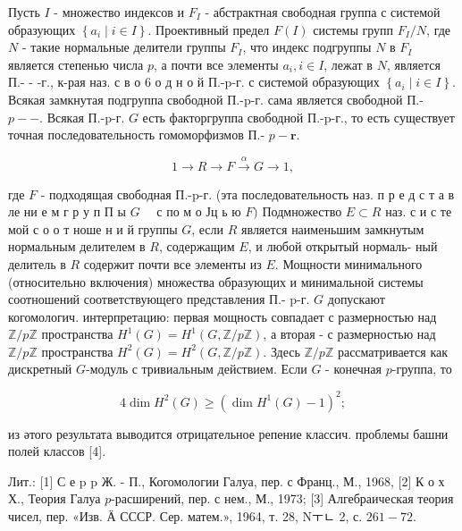 \documentclass[10pt]{article}
\begin{document}
Пусть $I$ - множество индексов и $F_{I}$ - абстрактная свободная группа с системой образующих $\left\{a_{i} \mid i \in I\right\}$. Проективный предел $F(I)$ системы групп $F_{I} / N$, где $N$ - такие нормальные делители группы $F_{I}$, что индекс подгруппы $N$ в $F_{I}$ является степенью числа $p$, а почти все элементы $a_{i}, i \in I$, лежат в $N$, является П.- - -г., к-рая наз. с в о 6 о д н о й П.-p-г. с системой образующих $\left\{a_{i} \mid i \in I\right\}$. Всякая замкнутая подгруппа свободной П.-p-г. сама является свободной П.- $p-\mathbf{-}$. Всякая П.-p-г. $G$ есть факторгруппа свободной П.-p-г., то есть существует точная последовательность гомоморфизмов П.- $p-\mathbf{r}$.



\[

1 \rightarrow R \longrightarrow F \stackrel{\alpha}{\rightarrow} G \longrightarrow 1,

\]



где $F$ - подходящая свободная П.-p-г. (эта последовательность наз. п р е д с т а в ле ни е м г р у п П ы $G \quad$ с по м о Јц ь ю $F)$ Подмножество $E \subset R$ наз. с и с те мой с о о т ноше н и й группы $G$, если $R$ является наименьшим замкнутым нормальным делителем в $R$, содержащим $E$, и любой открытый нормаль- ный делитель в $R$ содержит почти все элементы из $E$. Мощности минимального (относительно включения) множества образующих и минимальной системы соотношений соответствующего представления П.- p-г. $G$ допускают когомологич. интерпретацию: первая мощность совпадает с размерностью над $\mathbb{Z} / p \mathbb{Z}$ пространства $H^{1}(G)=H^{1}(G, \mathbb{Z} / p \mathbb{Z})$, а вторая - с размерностью над $\mathbb{Z} / p \mathbb{Z}$ пространства $H^{2}(G)=H^{2}(G, \mathbb{Z} / p \mathbb{Z})$. Здесь $\mathbb{Z} / p \mathbb{Z}$ рассматривается как дискретный $G$-модуль с тривиальным действием. Если $G$ - конечная $p$-группа, то



\[

4 \operatorname{dim} H^{2}(G) \geqslant\left(\operatorname{dim} H^{1}(G)-1\right)^{2} ;

\]



из әтого результата выводится отрицательное репение классич. проблемы башни полей классов [4].



Лит.: [1] С е p p Ж. - П., Когомологии Галуа, пер. с Франц., М., 1968, [2] К о х Х., Теория Галуа $p$-расширений, пер. с нем., М., 1973; [3] Алгебраическая теория чисел, пер. «Изв. Ӓ СССР. Сер. матем.», 1964, т. 28, Nㅜㄴ 2, с. $261-72$.
\end{document}

